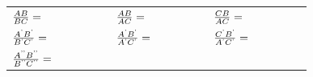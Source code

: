 {\begin{center}
\begin{xtabular*}{\mytablewidth}[t]{|p{10\mystarwidth}|p{10\mystarwidth}|p{10\mystarwidth}|}
     \tabularnewline{}
                $\frac{AB}{BC}=\phantom{\rule{42.67912pt}{0ex}}$
               &
                $\frac{AB}{AC}=\phantom{\rule{42.67912pt}{0ex}}$
               &
                $\frac{CB}{AC}=\phantom{\rule{42.67912pt}{0ex}}$
     \tabularnewline{}
                $\frac{{A}^{\text{'}}{B}^{\text{'}}}{{B}^{\text{'}}{C}^{\text{'}}}=\phantom{\rule{42.67912pt}{0ex}}$
               &
                $\frac{{A}^{\text{'}}{B}^{\text{'}}}{{A}^{\text{'}}{C}^{\text{'}}}=\phantom{\rule{42.67912pt}{0ex}}$
               &
                $\frac{{C}^{\text{'}}{B}^{\text{'}}}{{A}^{\text{'}}{C}^{\text{'}}}=\phantom{\rule{42.67912pt}{0ex}}$
     \tabularnewline{}
                $\frac{{A}^{\text{'}\text{'}}{B}^{\text{'}\text{'}}}{{B}^{\text{'}\text{'}}{C}^{\text{'}\text{'}}}=\phantom{\rule{42.67912pt}{0ex}}$
               &

\end{xtabular*}
\end{center}}
